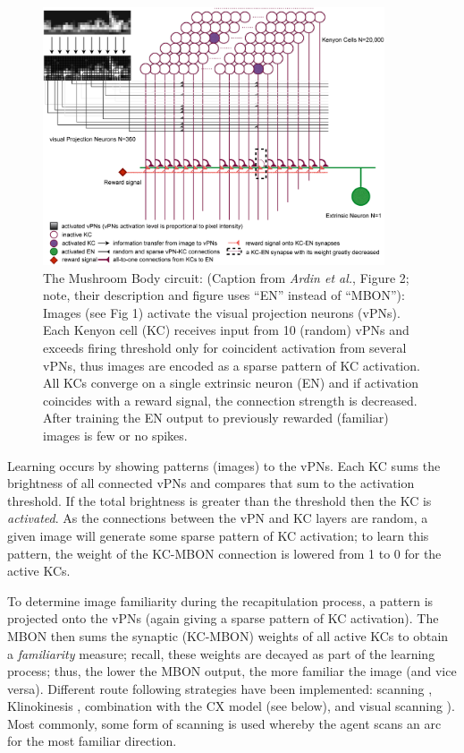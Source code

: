 \documentclass[a4paper,11pt,twoside,openright]{article}
\begin{document}
\begin{figure}
  \centering
  \includegraphics[width=0.9\textwidth]{Ardin2010MBModel}
  \caption{\label{fig:mb} The Mushroom Body circuit: (Caption from
    \textit{Ardin et al.}, Figure 2; note, their description and figure uses
    ``EN'' instead of ``MBON''): Images (see Fig 1) activate the visual
    projection neurons (vPNs). Each Kenyon cell (KC) receives input from 10
    (random) vPNs and exceeds firing threshold only for coincident activation
    from several vPNs, thus images are encoded as a sparse pattern of KC
    activation. All KCs converge on a single extrinsic neuron (EN) and if
    activation coincides with a reward signal, the connection strength is
    decreased. After training the EN output to previously rewarded (familiar)
    images is few or no spikes.}
\end{figure}

Learning occurs by showing patterns (images) to the vPNs. Each KC sums the
brightness of all connected vPNs and compares that sum to the activation
threshold. If the total brightness is greater than the threshold then the KC is
\textit{activated}. As the connections between the vPN and KC layers are random,
a given image will generate some sparse pattern of KC activation; to learn this
pattern, the weight of the KC-MBON connection is lowered from 1 to 0 for the
active KCs.
\newline
\par

To determine image familiarity during the recapitulation process, a pattern is
projected onto the vPNs (again giving a sparse pattern of KC activation).
The MBON then sums the synaptic (KC-MBON) weights of all active KCs to obtain a
\textit{familiarity} measure; recall, these weights are decayed as part of the
learning process; thus, the lower the MBON output, the more familiar the image
(and vice versa). Different route following strategies have been implemented:
scanning \cite{Ardin2016, Eberding2016, Zhang2017}, Klinokinesis
\cite{Zhang2017}, combination with the CX model \cite{Zhang2017}(see below), and
visual scanning \cite{Mitchell2018}). Most commonly, some form of scanning
is used whereby the agent scans an arc for the most familiar direction.
\newline
\par
\end{document}
